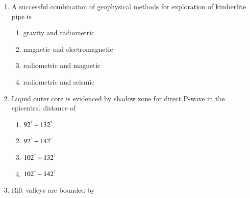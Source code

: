 \documentclass[journal,12pt,onecolumn]{IEEEtran}
\theoremstyle{remark}
\begin{document}
\begin{enumerate}
    \hfill{}
    
    \begin{multicols}{2}
        \begin{enumerate}
            \item oblate ellipse
            \item oblate ellipsoid
            \item prolate ellipse
            \item prolate ellipsoid
        \end{enumerate}
    \end{multicols}

    \item A successful combination of geophysical methods for exploration of kimberlite pipe is

    \hfill{}
    
    \begin{multicols}{2}
        \begin{enumerate}
            \item gravity and radiometric
            \item magnetic and electromagnetic
            \item radiometric and magnetic
            \item radiometric and seismic
        \end{enumerate}
    \end{multicols}

    \item Liquid outer core is evidenced by shadow zone for direct P-wave in the epicentral distance of

    \hfill{}
    
    \begin{multicols}{2}
        \begin{enumerate}
            \item $92^{\degree}-132^{\degree}$
            \item $92^{\degree}-142^{\degree}$
            \item $102^{\degree}-132^{\degree}$
            \item $102^{\degree}-142^{\degree}$
        \end{enumerate}
    \end{multicols}

    \item Rift valleys are bounded by


\end{enumerate}
\end{document}
